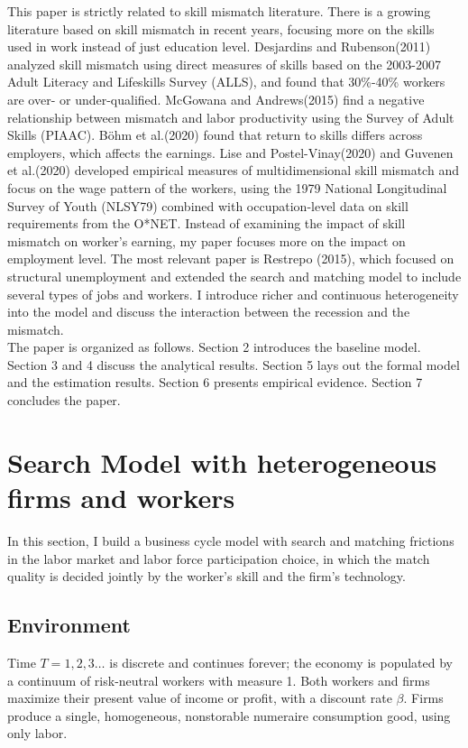 \documentclass[12pt]{article}
\newcommand{\1}{\mathbb{1}}
\begin{document}
This paper is strictly related to skill mismatch literature. There is a growing literature based on skill mismatch in recent years, focusing more on the skills used in work instead of just education level. Desjardins and Rubenson(2011)\cite{DesjardinsRubenson2011} analyzed skill mismatch using direct measures of skills based on the 2003-2007 Adult Literacy and Lifeskills Survey (ALLS), and found that 30\%-40\% workers are over- or under-qualified. McGowana and Andrews(2015)\cite{McGowanAndrews2015} find a negative relationship between mismatch and labor productivity using the Survey of Adult Skills (PIAAC). B{\"o}hm et al.(2020)\cite{Bohmetal2020} found that return to skills differs across employers, which affects the earnings. 
Lise and Postel-Vinay(2020)\cite{LisePV2020} and Guvenen et al.(2020)\cite{Guvenenetal2020} developed empirical measures of multidimensional skill mismatch and focus on the wage pattern of the workers, using the 1979 National Longitudinal Survey of Youth (NLSY79) combined with occupation-level data on skill requirements from the O*NET. Instead of examining the impact of skill mismatch on worker's earning, my paper focuses more on the impact on employment level.  
The most relevant paper is Restrepo (2015)\cite{Restrepo2015}, which focused on structural unemployment and extended the search and matching model to include several types of jobs and workers. I introduce richer and continuous heterogeneity into the model and discuss the interaction between the recession and the mismatch. \\

The paper is organized as follows. Section 2 introduces the baseline model. Section 3 and 4 discuss the analytical results. Section 5 lays out the formal model and the estimation results. Section 6 presents empirical evidence. Section 7 concludes the paper. 

\section{Search Model with heterogeneous firms and workers}
In this section, I build a business cycle model with search and matching frictions in the labor market and labor force participation choice, in which the match quality is decided jointly by the worker's skill and the firm's technology. 

\subsection{Environment}
Time $T = 1, 2, 3 \dots$ is discrete and continues forever; the economy is populated by a continuum of risk-neutral workers with measure 1. Both workers and firms maximize their present value of income or profit, with a discount rate $\beta$. Firms produce a single, homogeneous, nonstorable numeraire consumption good, using only labor. \\
\end{document}
